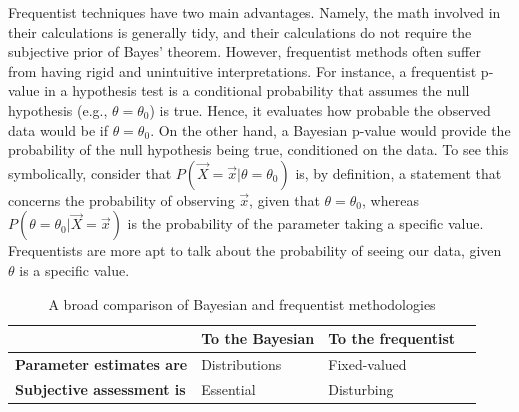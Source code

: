 \documentclass[12pt,twoside]{reedthesis}
\begin{document}
	Frequentist techniques have two main advantages. Namely, the math involved in their calculations is generally tidy, and their calculations do not require the subjective prior of Bayes' theorem. However, frequentist methods often suffer from having rigid and unintuitive interpretations. 
	For instance, a frequentist p-value in a hypothesis test is a conditional probability that assumes the null hypothesis (e.g., $\theta = \theta_0$) is true. Hence, it evaluates how probable the observed data would be if $\theta = \theta_0$. On the other hand, a Bayesian p-value would provide the probability of the null hypothesis being true, conditioned on the data. 
	To see this symbolically, consider that $P(\vec{X} = \vec{x} | \theta = \theta_0 )$ is, by definition, a statement that concerns the probability of observing $\vec{x}$, given that $\theta = \theta_0$, whereas $P(\theta = \theta_0 | \vec{X} = \vec{x})$ is the probability of the parameter taking a specific value. Frequentists are more apt to talk about the probability of seeing our data, given $\theta$ is a specific value.

\begin{table}[htdp] %
\caption[Comparison of Bayesian and Frequentist Reasoning]{A broad comparison of Bayesian and frequentist methodologies} 
\begin{center}
\begin{tabular}{l l l l} 

   &  \textbf{To the Bayesian} & \textbf{To the frequentist} \\ %
  \midrule %
\textbf{Parameter estimates are} & Distributions  & Fixed-valued \\ %
\textbf{Subjective assessment is} & Essential & Disturbing \\
\bottomrule %
\end{tabular}
\end{center}
\label{bvf} %
\end{table}
\end{document}
